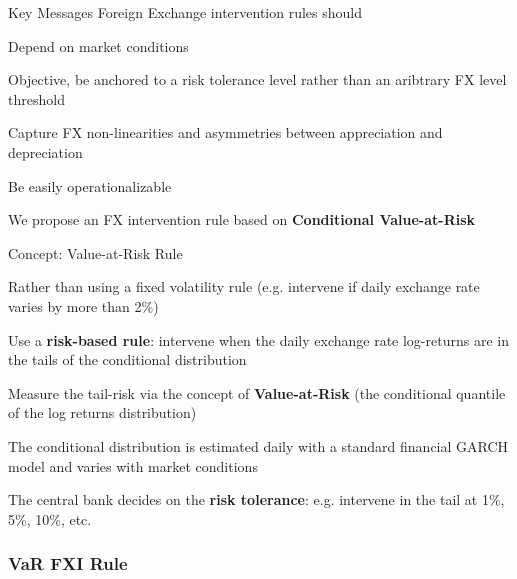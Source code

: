 \documentclass{beamer}
\newenvironment{largeitemize}{\itemize\addtolength{\itemsep}{10pt}}{\enditemize}
\begin{document}
\begin{frame}{Key Messages}
  Foreign Exchange intervention rules should\\
  \medskip
  
  \begin{largeitemize}
  \item Depend on market conditions
  \item Objective, be anchored to a risk tolerance level
    rather than an aribtrary FX level threshold
  \item Capture FX non-linearities and asymmetries between appreciation and
    depreciation
  \item Be easily operationalizable\\
  \end{largeitemize}

\medskip  
We propose an FX intervention rule based on \textbf{Conditional Value-at-Risk}  
\end{frame}


\begin{frame}{Concept: Value-at-Risk Rule}

  \begin{largeitemize}
    \item Rather than using a fixed volatility rule (e.g. intervene if daily
      exchange rate varies by more than 2\%)
    \item Use a \textbf{risk-based rule}: intervene when the daily exchange rate log-returns are in the
      tails of the conditional distribution
    \item Measure the tail-risk via the concept of \textbf{Value-at-Risk} (the
      conditional quantile of the log returns distribution) 
    \item The conditional distribution is estimated daily with a standard
      financial GARCH model and varies with market conditions
    \item The central bank decides on the \textbf{risk tolerance}:
      e.g. intervene in the tail at 1\%, 5\%, 10\%, etc.
  \end{largeitemize}
\end{frame}


\begin{frame}
  \frametitle{VaR FXI Rule}
\end{frame}
\end{document}
